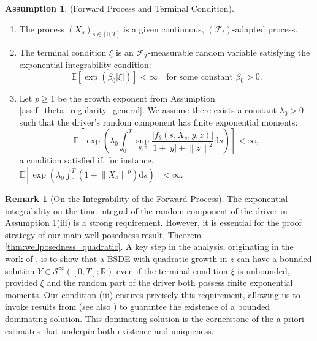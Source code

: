 \documentclass[qian]{imsart}
\newcommand{\R}{\mathbb{R}}
\newcommand{\E}{\mathbb{E}}
\newcommand{\Fcal}{\mathcal{F}}
\newcommand{\dd}{\mathrm{d}}
\newcommand{\norm}[1]{\left\lVert#1\right\rVert}
\newcommand{\abs}[1]{\left\lvert#1\right\rvert}
\theoremstyle{plain}
\theoremstyle{definition}
\newtheorem{assumption}[theorem]{Assumption}
\newtheorem{remark}[theorem]{Remark}
\begin{document}
\begin{assumption}(Forward Process and Terminal Condition).
\label{ass:fwd_terminal_regularity}
\begin{enumerate}[label=(\roman*)]
    \item The process $(X_s)_{s \in [0,T]}$ is a given continuous, $(\Fcal_t)$-adapted process.
    \item The terminal condition $\xi$ is an $\Fcal_T$-measurable random variable satisfying the exponential integrability condition:
    \[ \E[\exp(\beta_0 \abs{\xi})] < \infty \quad \text{for some constant } \beta_0 > 0. \]
    \item Let $p \ge 1$ be the growth exponent from Assumption \ref{ass:f_theta_regularity_general}. We assume there exists a constant $\lambda_0 > 0$ such that the driver's random component has finite exponential moments:
    \[ \E\left[\exp\left(\lambda_0 \int_0^T \sup_{y,z} \frac{\abs{f_\theta(s, X_s, y, z)}}{1+\abs{y}+\norm{z}^2} \dd s\right)\right] < \infty, \]
    a condition satisfied if, for instance, $\E\left[\exp\left(\lambda_0 \int_0^T (1+\norm{X_s}^p) \dd s\right)\right] < \infty$.
\end{enumerate}
\end{assumption}

\begin{remark}[On the Integrability of the Forward Process]
\label{rem:fwd_integrability_revised}
The exponential integrability on the time integral of the random component of the driver in Assumption \ref{ass:fwd_terminal_regularity}(iii) is a strong requirement. However, it is essential for the proof strategy of our main well-posedness result, Theorem \ref{thm:wellposedness_quadratic}. A key step in the analysis, originating in the work of \cite{Kobylanski2000}, is to show that a BSDE with quadratic growth in $z$ can have a bounded solution $Y \in \mathcal{S}^\infty([0,T]; \R)$ even if the terminal condition $\xi$ is unbounded, provided $\xi$ and the random part of the driver both possess finite exponential moments. Our condition (iii) ensures precisely this requirement, allowing us to invoke results from \cite{Kobylanski2000} (see also \cite{BriandEtAl2003}) to guarantee the existence of a bounded dominating solution. This dominating solution is the cornerstone of the a priori estimates that underpin both existence and uniqueness.
\end{remark}
\end{document}
